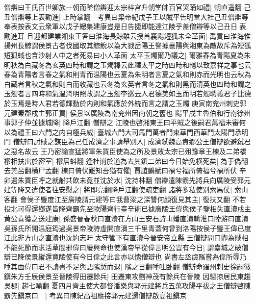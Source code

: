 僧辯曰王氏百世卿族一朝而墜僧辯迎太宗梓宫升朝堂帥百官哭踊如禮|{
	朝直遥翻}
己丑僧辯等上表勸進|{
	上時掌翻　考異曰梁帝紀戊子王以賊平吿明堂大社己丑僧辯等奉表按表文云衆軍以戊子總集建康豈是日告捷即能達江陵乎盖僧辯等以己丑日表勸進耳}
且迎都建業湘東王答曰淮海長鯨雖云授首襄陽短狐未全革面|{
	禹貢曰淮海惟揚州長鯨謂侯景古者伐國取其鯨鯢以為大戮岳陽王詧據襄陽與湘東為敵故斥為短狐短狐蜮也含沙射人中之者死易曰小人革面}
太平玉燭爾乃議之|{
	爾雅春為青陽夏為朱明秋為白藏冬為玄英四時和謂之玉燭釋云此釋太平之時四時和暢以致嘉祥之事也云春為青陽者言春之氣和則青而温陽也云夏為朱明者言夏之氣和則赤而光明也云秋為白藏者言秋之氣和則白而收藏也云冬為玄英者言冬之氣和則黑而清英也四時和謂之玉燭者言四時和氣温潤明照故謂之玉燭李巡云人君德美如玉而明若燭聘義君子比德於玉焉是時人君若德輝動於内則和氣應於外統而言之謂之玉燭}
庚寅南兖州刺史郭元建秦郡戍主郭正買|{
	侯景以廣陵為南兖州因南朝之舊也}
陽平戍主魯伯和行南徐州事郭子仲並據城降|{
	降戶江翻}
僧辯之江陵也啓湘東王曰平賊之後嗣君萬福未審何以為禮王曰六門之内自極兵威|{
	臺城六門大司馬門萬者門東華門西華門太陽門承明門}
僧辯曰討賊之謀臣為己任成濟之事請舉别人|{
	成濟弑魏高貴鄉公王僧辯欲避弑君之惡名故云}
王乃密諭宣猛將軍朱買臣使為之所及景敗太宗已殂豫章王棟及二弟橋樛相扶出於密室|{
	樛居蚪翻}
逢杜崱於道為去其鎻二弟曰今日始免横死矣|{
	為于偽翻去羌呂翻横尸孟翻}
棟曰倚伏難知吾猶有懼|{
	賈誼鵩賦曰禍兮福所倚福兮禍所伏}
辛卯遇朱買臣呼之就船共飲未竟並沈於水|{
	沈持林翻}
僧辯遣陳霸先將兵向廣陵受郭元建等降又遣使者往安慰之|{
	將即亮翻降戶江翻使疏吏翻}
諸將多私使别索馬仗|{
	索山客翻}
會侯子鑒度江至廣陵謂元建等曰我曹梁之深讐何顔復見其主|{
	復扶又翻}
不若投北可得還鄉遂皆降齊霸先至歐陽齊行臺辛術已據廣陵王偉與侯子鑒相失直瀆戍主黄公喜獲之送建康|{
	孫盛晉春秋曰直瀆在方山王安石詩山蟠直瀆輸淮口陸游曰直瀆吳孫氏所開温庭筠過吳景帝陵詩虛開直瀆三千里青蓋何曾到洛陽按侯子鑒王偉已度江此非方山之直瀆也沈約志旴太守管下有直瀆今晉安帝立縣}
王僧辯問曰卿為賊相不能死節而求活草間邪偉曰廢興命也使漢帝早從偉言明公豈有今日|{
	謂臺城之破僧辯已降侯景縱還竟陵使有今日偉之此言亦以愧僧辯也}
尚書左丞虞隲嘗為偉所辱乃唾其面偉曰君不讀書不足與語隲慙而退|{
	隲之日翻唾吐卧翻}
僧辯命羅州刺史徐嗣徽鎭朱方壬辰侯景至晉陵得田遷餘兵|{
	田遷東攻劉神茂有餘兵在晉陵}
因驅掠居民東趨吳郡|{
	趨七喻翻}
夏四月齊主使大都督潘樂與郭元建將兵五萬攻陽平拔之王僧辯啓陳霸先鎭京口　|{
	考異曰陳紀高祖應接郭元建還僧辯啟高祖鎭京}


